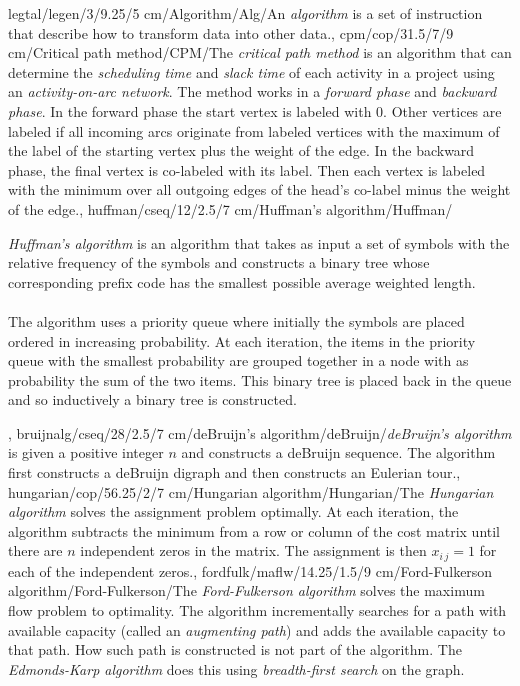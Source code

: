 legtal/legen/3/9.25/5 cm/Algorithm/Alg/{An \emph{algorithm} is a set of instruction that describe how to transform data into other data.},
cpm/cop/31.5/7/9 cm/{Critical path method}/{CPM}/{The \emph{critical path method} is an algorithm that can determine the \emph{scheduling time} and \emph{slack time} of each activity in a project using an \emph{activity-on-arc network}. The method works in a \emph{forward phase} and \emph{backward phase}. In the forward phase the start vertex is labeled with $0$. Other vertices are labeled if all incoming arcs originate from labeled vertices with the maximum of the label of the starting vertex plus the weight of the edge. In the backward phase, the final vertex is co-labeled with its label. Then each vertex is labeled with the minimum over all outgoing edges of the head's co-label minus the weight of the edge.},
huffman/cseq/12/2.5/7 cm/{Huffman's algorithm}/{Huffman}/{\emph{Huffman's algorithm} is an algorithm that takes as input a set of symbols with the relative frequency of the symbols and constructs a binary tree whose corresponding prefix code has the smallest possible average weighted length.\paragraph{}The algorithm uses a priority queue where initially the symbols are placed ordered in increasing probability. At each iteration, the items in the priority queue with the smallest probability are grouped together in a node with as probability the sum of the two items. This binary tree is placed back in the queue and so inductively a binary tree is constructed.},
bruijnalg/cseq/28/2.5/7 cm/{deBruijn's algorithm}/{deBruijn}/{\emph{deBruijn's algorithm} is given a positive integer $n$ and constructs a deBruijn sequence. The algorithm first constructs a deBruijn digraph and then constructs an Eulerian tour.},
hungarian/cop/56.25/2/7 cm/{Hungarian algorithm}/{Hungarian}/{The \emph{Hungarian algorithm} solves the assignment problem optimally. At each iteration, the algorithm subtracts the minimum from a row or column of the cost matrix until there are $n$ independent zeros in the matrix. The assignment is then $x_{i\,j}=1$ for each of the independent zeros.},
fordfulk/maflw/14.25/1.5/9 cm/{Ford-Fulkerson algorithm}/{Ford-Fulkerson}/{The \emph{Ford-Fulkerson algorithm} solves the maximum flow problem to optimality. The algorithm incrementally searches for a path with available capacity (called an \emph{augmenting path}) and adds the available capacity to that path. How such path is constructed is not part of the algorithm. The \emph{Edmonds-Karp algorithm} does this using \emph{breadth-first search} on the graph.}